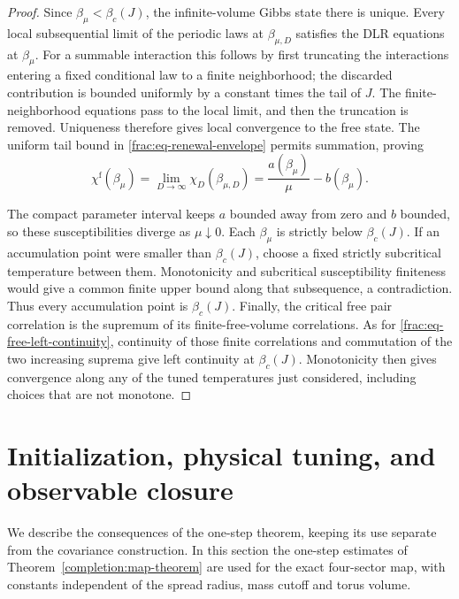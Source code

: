 \documentclass[11pt]{article}
\begin{document}
\begin{proof}
Since \(\beta_\mu<\beta_c(J)\), the infinite-volume Gibbs state
there is unique. Every local subsequential limit of the periodic
laws at \(\beta_{\mu,D}\) satisfies the DLR equations at
\(\beta_\mu\). For a summable interaction this follows by
first truncating the interactions entering a fixed conditional
law to a finite neighborhood; the discarded contribution is
bounded uniformly by a constant times the tail of \(J\).
The finite-neighborhood equations pass to the local limit, and
then the truncation is removed. Uniqueness therefore gives
local convergence to the free state. The uniform tail bound in
\eqref{frac:eq-renewal-envelope} permits summation, proving
\[
 \chi^{\mathrm f}(\beta_\mu)
 =\lim_{D\to\infty}\chi_D(\beta_{\mu,D})
 =\frac{a(\beta_\mu)}{\mu}-b(\beta_\mu).
\]

The compact parameter interval keeps \(a\) bounded away from
zero and \(b\) bounded, so these susceptibilities diverge as
\(\mu\downarrow0\). Each \(\beta_\mu\) is strictly below
\(\beta_c(J)\). If an accumulation point were smaller than
\(\beta_c(J)\), choose a fixed strictly subcritical temperature
between them. Monotonicity and subcritical susceptibility
finiteness would give a common finite upper bound along that
subsequence, a contradiction. Thus every accumulation point
is \(\beta_c(J)\).
Finally, the critical free pair correlation is the supremum
of its finite-free-volume correlations. As for
\eqref{frac:eq-free-left-continuity}, continuity of those finite
correlations and commutation of the two increasing suprema give
left continuity at \(\beta_c(J)\). Monotonicity then gives
convergence along any of the tuned temperatures just considered,
including choices that are not monotone.
\end{proof}

\section{Initialization, physical tuning, and observable closure}
\label{completion:flow-closure}
We describe the consequences of the one-step theorem, keeping its use
separate from the covariance construction. In this section the
one-step estimates of Theorem~\ref{completion:map-theorem} are used
for the exact four-sector map, with constants independent of the
spread radius, mass cutoff and torus volume.
\end{document}
